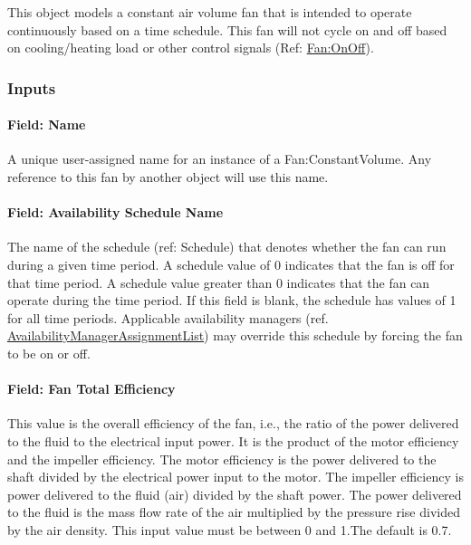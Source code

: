 This object models a constant air volume fan that is intended to operate continuously based on a time schedule. This fan will not cycle on and off based on cooling/heating load or other control signals (Ref: \hyperref[fanonoff]{Fan:OnOff}).

\subsubsection{Inputs}\label{inputs-019}

\paragraph{Field: Name}\label{field-name-018}

A unique user-assigned name for an instance of a Fan:ConstantVolume. Any reference to this fan by another object will use this name.

\paragraph{Field: Availability Schedule Name}\label{field-availability-schedule-name-007}

The name of the schedule (ref: Schedule) that denotes whether the fan can run during a given time period. A schedule value of 0 indicates that the fan is off for that time period. A schedule value greater than 0 indicates that the fan can operate during the time period. If this field is blank, the schedule has values of 1 for all time periods. Applicable availability managers (ref. \hyperref[availabilitymanagerassignmentlist]{AvailabilityManagerAssignmentList}) may override this schedule by forcing the fan to be on or off.

\paragraph{Field: Fan Total Efficiency}\label{field-fan-total-efficiency-000}

This value is the overall efficiency of the fan, i.e., the ratio of the power delivered to the fluid to the electrical input power. It is the product of the motor efficiency and the impeller efficiency. The motor efficiency is the power delivered to the shaft divided by the electrical power input to the motor. The impeller efficiency is power delivered to the fluid (air) divided by the shaft power. The power delivered to the fluid is the mass flow rate of the air multiplied by the pressure rise divided by the air density. This input value must be between 0 and 1.The default is 0.7.

